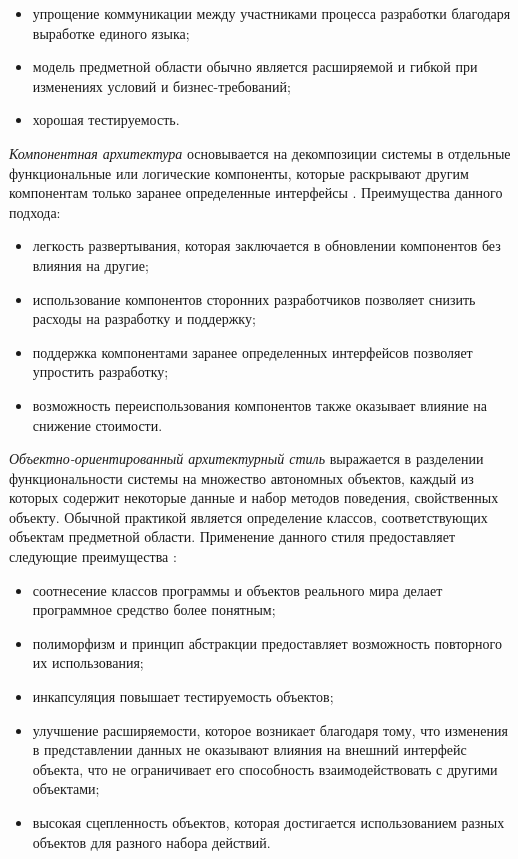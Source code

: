 \begin{itemize}
	\item упрощение коммуникации между участниками процесса разработки благодаря выработке единого языка;
	\item модель предметной области обычно является расширяемой и гибкой при изменениях условий и бизнес-требований;
	\item хорошая тестируемость.
\end{itemize}

\emph{Компонентная архитектура} основывается на декомпозиции системы в отдельные функциональные или логические
компоненты, которые раскрывают другим компонентам только заранее определенные интерфейсы
\cite{application_architecture_guide}. Преимущества данного подхода:

\begin{itemize}
	\item легкость развертывания, которая заключается в обновлении компонентов без влияния на другие;
	\item использование компонентов сторонних разработчиков позволяет снизить расходы на разработку и поддержку;
	\item поддержка компонентами заранее определенных интерфейсов позволяет упростить разработку;
	\item возможность переиспользования компонентов также оказывает влияние на снижение стоимости.
\end{itemize}

\emph{Объектно-ориентированный архитектурный стиль} выражается в разделении функциональности системы на множество
автономных объектов, каждый из которых содержит некоторые данные и набор методов поведения, свойственных объекту.
Обычной практикой является определение классов, соответствующих объектам предметной области. Применение данного стиля
предоставляет следующие преимущества \cite{application_architecture_guide}:

\begin{itemize}
	\item соотнесение классов программы и объектов реального мира делает программное средство более понятным;
	\item полиморфизм и принцип абстракции предоставляет возможность повторного их использования;
	\item инкапсуляция повышает тестируемость объектов;
  \item улучшение расширяемости, которое возникает благодаря тому, что изменения в представлении данных не оказывают
  влияния на внешний интерфейс объекта, что не ограничивает его способность взаимодействовать с другими объектами;
	\item высокая сцепленность объектов, которая достигается использованием разных объектов для разного набора действий.
\end{itemize}

